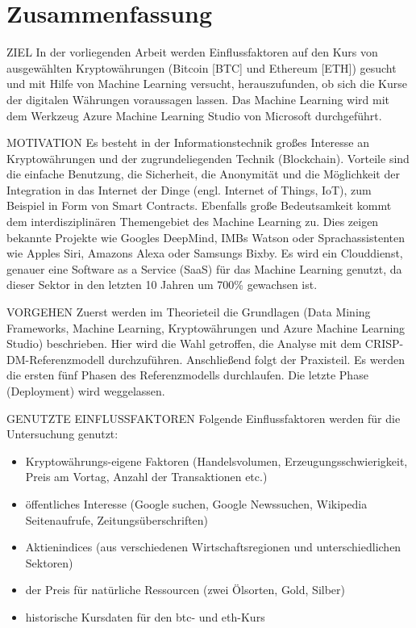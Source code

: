 \chapter*{Zusammenfassung}

{\normalsize ZIEL} \newline
In der vorliegenden Arbeit werden Einflussfaktoren auf den Kurs von ausgewählten Kryptowährungen (Bitcoin [BTC] und Ethereum [ETH]) gesucht und mit Hilfe von Machine Learning versucht, herauszufunden, ob sich die Kurse der digitalen Währungen voraussagen lassen. Das Machine Learning wird mit dem Werkzeug Azure Machine Learning Studio von Microsoft durchgeführt.

{\normalsize MOTIVATION} \newline
Es besteht in der Informationstechnik großes Interesse an Kryptowährungen und der zugrundeliegenden Technik (Blockchain). Vorteile sind die einfache Benutzung, die Sicherheit, die Anonymität und die Möglichkeit der Integration in das Internet der Dinge (engl. Internet of Things, IoT), zum Beispiel in Form von Smart Contracts. \newline
Ebenfalls große Bedeutsamkeit kommt dem interdisziplinären Themengebiet des Machine Learning zu. Dies zeigen bekannte Projekte wie Googles DeepMind, IMBs Watson oder Sprachassistenten wie Apples Siri, Amazons Alexa oder Samsungs Bixby.
\newline
Es wird ein Clouddienst, genauer eine Software as a Service (SaaS) für das Machine Learning genutzt, da dieser Sektor in den letzten 10 Jahren um 700\% gewachsen ist.

{\normalsize VORGEHEN} \newline
Zuerst werden im Theorieteil die Grundlagen (Data Mining Frameworks, Machine Learning, Kryptowährungen und Azure Machine Learning Studio) beschrieben. Hier wird die Wahl getroffen, die Analyse mit dem CRISP-DM-Referenzmodell durchzuführen.\newline
Anschließend folgt der Praxisteil. Es werden die ersten fünf Phasen des Referenzmodells durchlaufen. Die letzte Phase (Deployment) wird weggelassen.

{\normalsize GENUTZTE EINFLUSSFAKTOREN} \newline
Folgende Einflussfaktoren werden für die Untersuchung genutzt:
\begin{itemize}
\item Kryptowährungs-eigene Faktoren (Handelsvolumen, Erzeugungsschwierigkeit, Preis am Vortag, Anzahl der Transaktionen etc.)
\item öffentliches Interesse (Google suchen, Google Newssuchen, Wikipedia Seitenaufrufe, Zeitungsüberschriften)
\item Aktienindices (aus verschiedenen Wirtschaftsregionen und unterschiedlichen Sektoren)
\item der Preis für natürliche Ressourcen (zwei Ölsorten, Gold, Silber)
\item historische Kursdaten für den \gls{btc}- und \gls{eth}-Kurs
\end{itemize}

